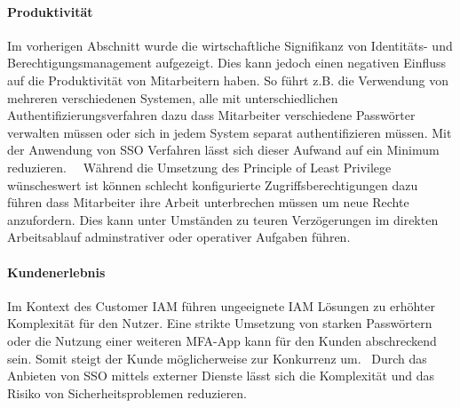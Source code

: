 \documentclass[12pt]{article}
\begin{document}
\paragraph{Produktivität}
Im vorherigen Abschnitt wurde die wirtschaftliche Signifikanz von Identitäts- und Berechtigungsmanagement aufgezeigt. Dies kann jedoch einen negativen Einfluss auf die Produktivität von Mitarbeitern haben. So führt z.B. die Verwendung von mehreren verschiedenen Systemen, alle mit unterschiedlichen Authentifizierungsverfahren dazu dass Mitarbeiter verschiedene Passwörter verwalten müssen oder sich in jedem System separat authentifizieren müssen. Mit der Anwendung von SSO Verfahren lässt sich dieser Aufwand auf ein Minimum reduzieren.~\cite{radha2012survey}~\cite{haag2012selecting} Während die Umsetzung des Principle of Least Privilege wünscheswert ist können schlecht konfigurierte Zugriffsberechtigungen dazu führen dass Mitarbeiter ihre Arbeit unterbrechen müssen um neue Rechte anzufordern. Dies kann unter Umständen zu teuren Verzögerungen im direkten Arbeitsablauf adminstrativer oder operativer Aufgaben führen.~\cite{weishaupl2015towards}
\paragraph{Kundenerlebnis}
Im Kontext des Customer IAM führen ungeeignete IAM Lösungen zu erhöhter Komplexität für den Nutzer. Eine strikte Umsetzung von starken Passwörtern oder die Nutzung einer weiteren MFA-App kann für den Kunden abschreckend sein. Somit steigt der Kunde möglicherweise zur Konkurrenz um.~\cite{azhar2014economics} Durch das Anbieten von SSO mittels externer Dienste lässt sich die Komplexität und das Risiko von Sicherheitsproblemen reduzieren.
\end{document}
